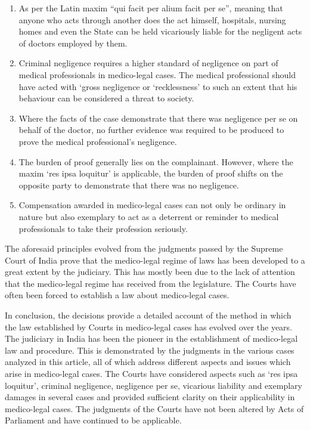 \begin{multicols}{2}
\begin{enumerate}
\item As per the Latin maxim “qui facit per alium facit per se”, meaning that anyone who acts through
another does the act himself, hospitals, nursing homes and even the State can be held vicariously
liable for the negligent acts of doctors employed by them.

\item Criminal negligence requires a higher standard of negligence on part of medical professionals
in medico-legal cases. The medical professional should have acted with ‘gross negligence or
‘recklessness’ to such an extent that his behaviour can be considered a threat to society.

\item Where the facts of the case demonstrate that there was negligence per se on behalf of the
doctor, no further evidence was required to be produced to prove the medical professional’s
negligence.

\item The burden of proof generally lies on the complainant. However, where the maxim ‘res ipsa
loquitur’ is applicable, the burden of proof shifts on the opposite party to demonstrate that there
was no negligence.

\item Compensation awarded in medico-legal cases can not only be ordinary in nature but also
exemplary to act as a deterrent or reminder to medical professionals to take their profession
seriously.
\end{enumerate}

\vspace{-.2cm}

\noi
The aforesaid principles evolved from the judgments passed by the Supreme Court of India prove
that the medico-legal regime of laws has been developed to a great extent by the judiciary. This
has mostly been due to the lack of attention that the medico-legal regime has received from the
legislature. The Courts have often been forced to establish a law about medico-legal cases.


\noi
In conclusion, the decisions provide a detailed account of the method in which the law established
by Courts in medico-legal cases has evolved over the years. The judiciary in India has been the
pioneer in the establishment of medico-legal law and procedure. This is demonstrated by the judgments in the various cases analyzed in this article, all of which address different aspects and
issues which arise in medico-legal cases. The Courts have considered aspects such as ‘res ipsa
loquitur’, criminal negligence, negligence per se, vicarious liability and exemplary damages in
several cases and provided sufficient clarity on their applicability in medico-legal cases. The
judgments of the Courts have not been altered by Acts of Parliament and have continued to be
applicable.


\end{multicols}
